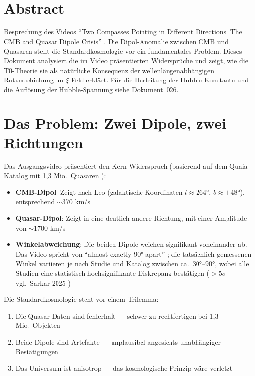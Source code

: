 \section*{Abstract}
	Besprechung des Videos ``Two Compasses Pointing in Different Directions: The CMB and Quasar Dipole Crisis'' \cite{video}. Die Dipol-Anomalie zwischen CMB und Quasaren stellt die Standardkosmologie vor ein fundamentales Problem. Dieses Dokument analysiert die im Video präsentierten Widersprüche und zeigt, wie die T0-Theorie sie als natürliche Konsequenz der wellenlängenabhängigen Rotverschiebung im $\xi$-Feld erklärt. Für die Herleitung der Hubble-Konstante und die Auflösung der Hubble-Spannung siehe Dokument~026.

\section{Das Problem: Zwei Dipole, zwei Richtungen}

	Das Ausgangsvideo \cite{video} präsentiert den Kern-Widerspruch (basierend auf dem Quaia-Katalog mit 1,3 Mio.\ Quasaren \cite{storey2024}):
	\begin{itemize}
		\item \textbf{CMB-Dipol}: Zeigt nach Leo (galaktische Koordinaten $l \approx 264°$, $b \approx +48°$), entsprechend $\sim$370 km/s
		\item \textbf{Quasar-Dipol}: Zeigt in eine deutlich andere Richtung, mit einer Amplitude von $\sim$1700 km/s \cite{mittal2024}
		\item \textbf{Winkelabweichung}: Die beiden Dipole weichen signifikant voneinander ab. Das Video spricht von ``almost exactly 90° apart'' \cite{secrest2024}; die tatsächlich gemessenen Winkel variieren je nach Studie und Katalog zwischen ca.\ $30°$--$90°$, wobei alle Studien eine statistisch hochsignifikante Diskrepanz bestätigen ($> 5\sigma$, vgl.\ Sarkar 2025 \cite{sarkar2025})
	\end{itemize}

	Die Standardkosmologie steht vor einem Trilemma:
	\begin{enumerate}
		\item Die Quasar-Daten sind fehlerhaft --- schwer zu rechtfertigen bei 1,3 Mio.\ Objekten
		\item Beide Dipole sind Artefakte --- unplausibel angesichts unabhängiger Bestätigungen
		\item Das Universum ist anisotrop --- das kosmologische Prinzip wäre verletzt
	\end{enumerate}

